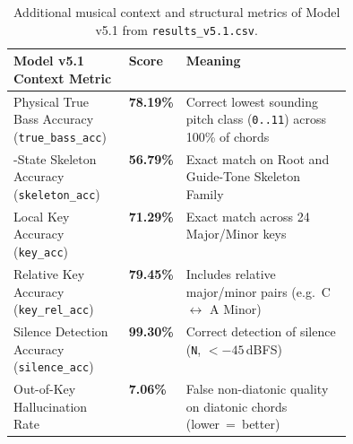 \documentclass[a4paper]{article}
\begin{document}
\begin{table}[H]
    \centering
    \small
    \begin{tabularx}{\linewidth}{@{}
        >{\raggedright\arraybackslash}p{0.34\linewidth}
        >{\centering\arraybackslash}p{0.10\linewidth}
        >{\raggedright\arraybackslash}X@{}}
        \toprule
        \textbf{Model v5.1 Context Metric} & \textbf{Score} & \textbf{Meaning} \\
        \midrule
        Physical True Bass Accuracy (\texttt{true\_bass\_acc}) & \textbf{78.19\%} & Correct lowest sounding pitch class (\texttt{0..11}) across 100\% of chords \\
        \addlinespace[2pt]
        145-State Skeleton Accuracy (\texttt{skeleton\_acc}) & \textbf{56.79\%} & Exact match on Root and Guide-Tone Skeleton Family \\
        \addlinespace[2pt]
        Local Key Accuracy (\texttt{key\_acc}) & \textbf{71.29\%} & Exact match across 24 Major/Minor keys \\
        \addlinespace[2pt]
        Relative Key Accuracy (\texttt{key\_rel\_acc}) & \textbf{79.45\%} & Includes relative major/minor pairs (e.g.\ C $\leftrightarrow$ A Minor) \\
        \addlinespace[2pt]
        Silence Detection Accuracy (\texttt{silence\_acc}) & \textbf{99.30\%} & Correct detection of silence (\texttt{N}, $<{-45}$\,dBFS) \\
        \addlinespace[2pt]
        Out-of-Key Hallucination Rate & \textbf{7.06\%} & False non-diatonic quality on diatonic chords (lower~=~better) \\
        \bottomrule
    \end{tabularx}
    \caption{Additional musical context and structural metrics of Model v5.1 from \texttt{results\_v5.1.csv}.}
    \label{tab:v51_extra_metrics}
\end{table}
\end{document}
